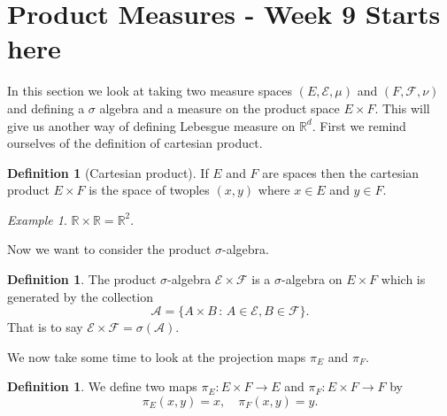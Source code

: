 \documentclass[11pt]{article}
\theoremstyle{definition}
\newtheorem{dfn}[thm]{Definition}
\theoremstyle{remark}
\newtheorem{ex}[thm]{Example}
\begin{document}
\section{Product Measures - Week 9 Starts here}

In this section we look at taking two measure spaces $(E, \mathcal{E}, \mu)$ and $(F, \mathcal{F}, \nu)$ and defining a $\sigma$ algebra and a measure on the product space $E \times F$. This will give us another way of defining Lebesgue measure on $\mathbb{R}^d$. First we remind ourselves of the definition of cartesian product.

\begin{dfn}[Cartesian product]
If $E$ and $F$ are spaces then the cartesian product $E \times F$ is the space of twoples $(x,y)$ where $x \in E$ and $y \in F$.
\end{dfn}
\begin{ex}
$\mathbb{R} \times \mathbb{R} = \mathbb{R}^2$.
\end{ex}

Now we want to consider the product $\sigma$-algebra. 
\begin{dfn}
The product $\sigma$-algebra $\mathcal{E} \times \mathcal{F}$ is a $\sigma$-algebra on $E \times F$ which is generated by the collection 
\[ \mathcal{A} = \{ A \times B \,:\, A \in \mathcal{E}, B \in \mathcal{F}\}. \] That is to say $\mathcal{E} \times \mathcal{F} = \sigma(\mathcal{A}).$
\end{dfn}

We now take some time to look at the projection maps $\pi_E$ and $\pi_F$. 
\begin{dfn}
We define two maps $\pi_E: E \times F \rightarrow E$ and $\pi_F: E \times F \rightarrow F$ by
\[ \pi_E (x,y) = x, \quad \pi_F(x,y) = y. \]
\end{dfn}
\end{document}
